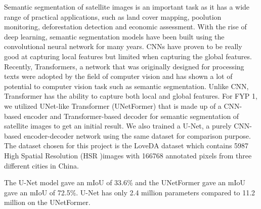 
Semantic segmentation of satellite images is an important task as it has a wide range of practical applications, such as land cover mapping, poolution monitoring, deforestation detection and economic assessment. With the rise of deep learning, semantic segmentation models have been built using the convolutional neural network for many years. CNNs have proven to be really good at capturing local features but limited when capturing the global features. Recently, Transformers, a network that was originally designed for processing texts were adopted by the field of computer vision and has shown a lot of potential to computer vision task such as semantic segmentation. Unlike CNN, Transformer has the ability to capture both local and global features. For FYP 1, we utilized UNet-like Transformer (UNetFormer) that is made up of a CNN-based encoder and Transformer-based decoder for semantic segmentation of satellite images to get an initial result. We also trained a U-Net, a purely CNN-based encoder-decoder network using the same dataset for comparison purpose. The dataset chosen for this project is the LoveDA dataset which contains 5987 High Spatial Resolution (HSR )images with 166768 annotated pixels from three different cities in China.

The U-Net model gave an mIoU of 33.6\% and the UNetFormer gave an mIoU gave an mIoU of 72.5\%. U-Net has only 2.4 million parameters compared to 11.2 million on the UNetFormer.

